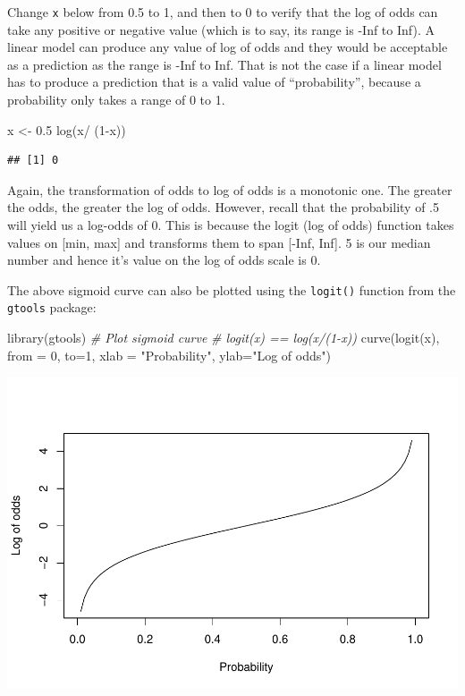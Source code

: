 \documentclass[
]{article}
\newenvironment{Shaded}{\begin{snugshade}}{\end{snugshade}}
\newcommand{\AttributeTok}[1]{\textcolor[rgb]{0.77,0.63,0.00}{#1}}
\newcommand{\CommentTok}[1]{\textcolor[rgb]{0.56,0.35,0.01}{\textit{#1}}}
\newcommand{\DecValTok}[1]{\textcolor[rgb]{0.00,0.00,0.81}{#1}}
\newcommand{\FloatTok}[1]{\textcolor[rgb]{0.00,0.00,0.81}{#1}}
\newcommand{\FunctionTok}[1]{\textcolor[rgb]{0.00,0.00,0.00}{#1}}
\newcommand{\NormalTok}[1]{#1}
\newcommand{\OtherTok}[1]{\textcolor[rgb]{0.56,0.35,0.01}{#1}}
\newcommand{\SpecialCharTok}[1]{\textcolor[rgb]{0.00,0.00,0.00}{#1}}
\newcommand{\StringTok}[1]{\textcolor[rgb]{0.31,0.60,0.02}{#1}}
\begin{document}
Change \texttt{x} below from 0.5 to 1, and then to 0 to verify that the
log of odds can take any positive or negative value (which is to say,
its range is -Inf to Inf). A linear model can produce any value of log
of odds and they would be acceptable as a prediction as the range is
-Inf to Inf. That is not the case if a linear model has to produce a
prediction that is a valid value of ``probability'', because a
probability only takes a range of 0 to 1.

\begin{Shaded}
\begin{Highlighting}[]
\NormalTok{x }\OtherTok{\textless{}{-}} \FloatTok{0.5}
\FunctionTok{log}\NormalTok{(x}\SpecialCharTok{/}\NormalTok{ (}\DecValTok{1}\SpecialCharTok{{-}}\NormalTok{x))}
\end{Highlighting}
\end{Shaded}

\begin{verbatim}
## [1] 0
\end{verbatim}

Again, the transformation of odds to log of odds is a monotonic one. The
greater the odds, the greater the log of odds. However, recall that the
probability of .5 will yield us a log-odds of 0. This is because the
logit (log of odds) function takes values on {[}min, max{]} and
transforms them to span {[}-Inf, Inf{]}. 5 is our median number and
hence it's value on the log of odds scale is 0.

The above sigmoid curve can also be plotted using the \texttt{logit()}
function from the \texttt{gtools} package:

\begin{Shaded}
\begin{Highlighting}[]
\FunctionTok{library}\NormalTok{(gtools)}
\CommentTok{\# Plot sigmoid curve}
\CommentTok{\# logit(x) == log(x/(1{-}x))}
\FunctionTok{curve}\NormalTok{(}\FunctionTok{logit}\NormalTok{(x), }\AttributeTok{from =} \DecValTok{0}\NormalTok{, }\AttributeTok{to=}\DecValTok{1}\NormalTok{, }\AttributeTok{xlab =} \StringTok{"Probability"}\NormalTok{, }\AttributeTok{ylab=}\StringTok{"Log of odds"}\NormalTok{)}
\end{Highlighting}
\end{Shaded}

\includegraphics{classification1_files/figure-latex/unnamed-chunk-5-1.pdf}
\end{document}

